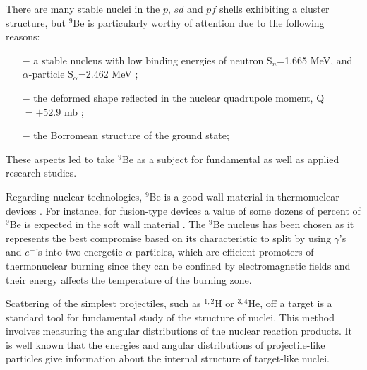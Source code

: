 \documentclass[
12pt, %
oneside, %
english, %
onehalfspacing, %
headsepline, %
]{MastersDoctoralThesis} %
\begin{document}
There are many stable nuclei in the $p$, $sd$ and $pf$ shells exhibiting a cluster structure, but $^9$Be is particularly worthy of attention due to the following reasons: \begin{itemize}
\item[$-$] a stable nucleus with low binding energies of neutron S$_n$=1.665 MeV, and $\alpha$-particle S$_\alpha$=2.462 MeV \cite{separationneutron}; 
\item[$-$] the deformed shape reflected in the nuclear quadrupole moment, Q$=+52.9 $ mb \cite{quadrupole}; 
\item[$-$]  the Borromean structure of the ground state;
\end{itemize}
These aspects led to take $^9$Be as a subject for fundamental  as well as applied research  studies.

Regarding nuclear technologies, $^9$Be is a good wall material in thermonuclear devices \cite{kukulin2010, seksembayev2018}.
For instance, for fusion-type devices a value of some dozens of percent  of $^9$Be is expected in the soft wall material \cite{seksembayev2018}.
The $^9$Be nucleus has been chosen as it represents the best compromise based  on its characteristic to split by using $\gamma$'s and $e^-$'s into two energetic $\alpha$-particles, which are efficient promoters of thermonuclear burning since they can be confined by electromagnetic fields and their energy affects the temperature of the burning zone.

Scattering of the simplest projectiles, such as ${}^{1,2}$H or ${}^{3,4}$He, off a target is a standard tool for fundamental study of the structure of nuclei. This method involves measuring the angular distributions of the nuclear reaction products. It is well known that the energies and angular distributions of projectile-like particles give information about the internal structure of target-like nuclei.
	
\end{document}

